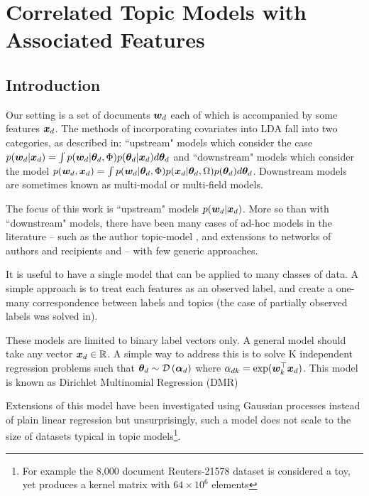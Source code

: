 
\newcommand \mnord[4]  { \mathcal{N}_{{#1}} \left(#2, #3, #4\right) }

\chapter{Correlated Topic Models with Associated Features}

\section{Introduction}
Our setting is a set of documents $\bm w_d$ each of which is accompanied by some features $\bm x_d$. The methods of incorporating covariates into LDA fall into two categories, as described in\cite{Mimno2008}: ``upstream" models which consider the case $p({ \bm w_d } | { \bm x_d }) = \int p({ \bm w_d }|{ \bm \theta_d }, \Phi)p({ \bm \theta_d }|{ \bm x_d }) d{ \bm \theta_d }$ 
and ``downstream" models which consider the model $p({ \bm w_d }, { \bm x_d }) = \int p({ \bm w_d }|{ \bm \theta_d }, \Phi)p({ \bm x_d }|{ \bm \theta_d }, \Omega)p({ \bm \theta_d })d{ \bm \theta_d }$. Downstream models are sometimes known as multi-modal\cite{Virtanen2012a} or multi-field\cite{Salomatin2009} models.

The focus of this work is ``upstream" models $p({ \bm w_d } | { \bm x_d })$. More so than with ``downstream" models, there have been many cases of ad-hoc models in the literature -- such as the author topic-model \cite{RosenZvi2004}, and extensions to networks of authors and recipients\cite{MacCallum2007}\cite{Sachan2012} and \cite{Kang2013} -- with few generic approaches.

It is useful to have a single model that can be applied to many classes of data. A simple approach is to treat each features as an observed label, and create a one-many correspondence between labels and topics\cite{Ramage2009} (the case of partially observed labels was solved in\cite{Rubin2011}).

These models are limited to binary label vectors only. A general model should take any vector ${ \bm x_d } \in \mathbb{R}$. A simple way to address this is to solve K independent regression problems such that ${ \bm \theta_d } \sim \mathcal{D} \left( {\bm \alpha_{d}} \right)$ where $\alpha_{dk} = \exp(\bm w_k^\top\bm x_d)$\cite{Mimno2008}. This model is known as Dirichlet Multinomial Regression (DMR)

Extensions of this model have been investigated using Gaussian processes instead of plain linear regression\cite{Hennig2012} but unsurprisingly, such a model does not scale to the size of datasets typical in topic models\footnote{For example the 8,000 document Reuters-21578 dataset is considered a toy, yet produces a kernel matrix with $64 \times 10^6$ elements}.

